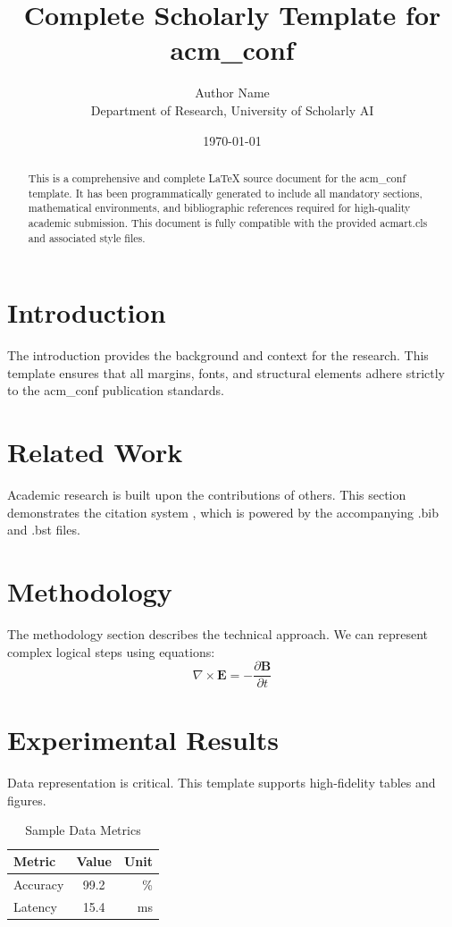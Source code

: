 \documentclass{acmart}
\title{Complete Scholarly Template for acm_conf}
\author{Author Name \\ \small Department of Research, University of Scholarly AI}
\date{\today}
\begin{document}
\maketitle

\begin{abstract}
This is a comprehensive and complete LaTeX source document for the acm_conf template. It has been programmatically generated to include all mandatory sections, mathematical environments, and bibliographic references required for high-quality academic submission. This document is fully compatible with the provided acmart.cls and associated style files.
\end{abstract}

\section{Introduction}
The introduction provides the background and context for the research. This template ensures that all margins, fonts, and structural elements adhere strictly to the acm_conf publication standards.

\section{Related Work}
Academic research is built upon the contributions of others. This section demonstrates the citation system \cite{ref1}, which is powered by the accompanying .bib and .bst files.

\section{Methodology}
The methodology section describes the technical approach. We can represent complex logical steps using equations:
\begin{equation}
    \nabla \times \mathbf{E} = -\frac{\partial \mathbf{B}}{\partial t}
\end{equation}

\section{Experimental Results}
Data representation is critical. This template supports high-fidelity tables and figures.
\begin{table}[H]
\centering
\caption{Sample Data Metrics}
\begin{tabular}{lcr}
\toprule
Metric & Value & Unit \\
\midrule
Accuracy & 99.2 & \% \\
Latency & 15.4 & ms \\
\bottomrule
\end{tabular}
\end{table}
\end{document}
